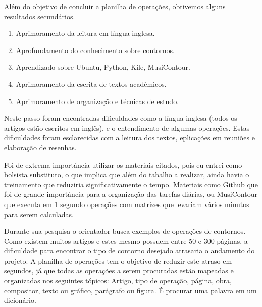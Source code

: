 \documentclass[11pt]{article}
\begin{document}
Além do objetivo de concluir a planilha de operações, obtivemos alguns
resultados secundários.

\begin{enumerate}
\item Aprimoramento da leitura em língua inglesa.
\item Aprofundamento do conhecimento sobre contornos.
\item Aprendizado sobre Ubuntu, Python, Kile, MusiContour.
\item Aprimoramento da escrita de textos acadêmicos.
\item Aprimoramento de organização e técnicas de estudo.
\end{enumerate}

\label{sec:discussao}


Neste passo foram encontradas dificuldades como a língua inglesa
(todos os artigos estão escritos em inglês), e o entendimento de
algumas operações. Estas dificuldades foram esclarecidas com a leitura
dos textos, eplicações em reuniões e elaboração de resenhas.

Foi de extrema importância utilizar os materiais citados, pois eu entrei como bolsista
substituto, o que implica que além do tabalho a realizar, ainda havia o treinamento
que reduziria significativamente o tempo. Materiais como Github que foi de grande importância
para a organização das tarefas diárias, ou MusiContour que executa em 1 segundo operações
com matrizes que levariam vários minutos para serem calculadas.

Durante sua pesquisa o orientador busca exemplos de operações de contornos. Como existem
muitos artigos e estes mesmo possuem entre 50 e 300 páginas, a dificuldade para encontrar
o tipo de contorno desejado atrasaria o andamento do projeto. A planilha de operações tem o
objetivo de reduzir este atraso em segundos, já que todas as operações a serem procuradas
estão mapeadas e organizadas nos seguintes tópicos: Artigo, tipo de operação, página, obra,
compositor, texto ou gráfico, parágrafo ou figura. É procurar uma palavra em um dicionário.
\end{document}
